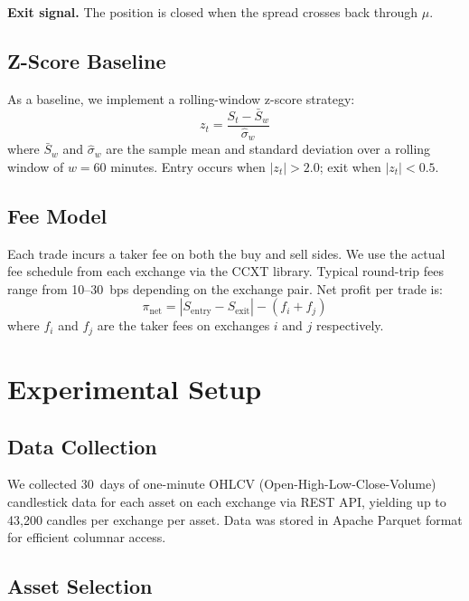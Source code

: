 \documentclass[sigconf,nonacm=false]{acmart}
\begin{document}
\textbf{Exit signal.} The position is closed when the spread crosses back through $\mu$.

\subsection{Z-Score Baseline}\label{sec:zscore}

As a baseline, we implement a rolling-window z-score strategy:
\begin{equation}
    z_t = \frac{S_t - \bar{S}_w}{\hat{\sigma}_w}
\end{equation}
where $\bar{S}_w$ and $\hat{\sigma}_w$ are the sample mean and standard deviation over a rolling window of $w = 60$ minutes. Entry occurs when $|z_t| > 2.0$; exit when $|z_t| < 0.5$.

\subsection{Fee Model}\label{sec:fees}

Each trade incurs a taker fee on both the buy and sell sides. We use the actual fee schedule from each exchange via the CCXT library. Typical round-trip fees range from 10--30~bps depending on the exchange pair. Net profit per trade is:
\begin{equation}
    \pi_{\text{net}} = |S_{\text{entry}} - S_{\text{exit}}| - (f_i + f_j)
\end{equation}
where $f_i$ and $f_j$ are the taker fees on exchanges $i$ and $j$ respectively.

\section{Experimental Setup}\label{sec:setup}

\subsection{Data Collection}

We collected 30~days of one-minute OHLCV (Open-High-Low-Close-Volume) candlestick data for each asset on each exchange via REST API, yielding up to 43,200 candles per exchange per asset. Data was stored in Apache Parquet format for efficient columnar access.

\subsection{Asset Selection}
\end{document}
